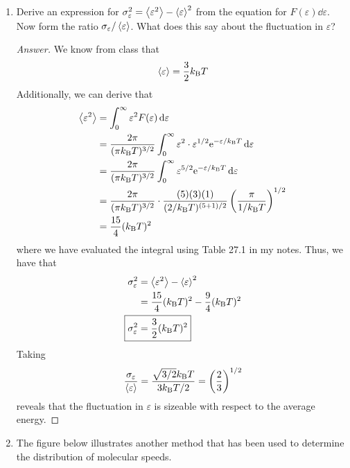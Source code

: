 \documentclass[../psets.tex]{subfiles}
\begin{document}
\begin{enumerate}[label={\textbf{27-\arabic*.}},leftmargin=3.5em]
    \item Derive an expression for $\sigma_\varepsilon^2=\prb{\varepsilon^2}-\prb{\varepsilon}^2$ from the equation for $F(\varepsilon)\dd{\varepsilon}$. Now form the ratio $\sigma_\varepsilon/\prb{\varepsilon}$. What does this say about the fluctuation in $\varepsilon$?
    \begin{proof}[Answer]
        We know from class that
        \begin{equation*}
            \prb{\varepsilon} = \frac{3}{2}\kB T
        \end{equation*}
        Additionally, we can derive that
        \begin{align*}
            \prb{\varepsilon^2} &= \int_0^\infty\varepsilon^2F(\varepsilon)\dd{\varepsilon}\\
            &= \frac{2\pi}{(\pi\kB T)^{3/2}}\int_0^\infty\varepsilon^2\cdot\varepsilon^{1/2}\e[-\varepsilon/\kB T]\dd{\varepsilon}\\
            &= \frac{2\pi}{(\pi\kB T)^{3/2}}\int_0^\infty\varepsilon^{5/2}\e[-\varepsilon/\kB T]\dd{\varepsilon}\\
            &= \frac{2\pi}{(\pi\kB T)^{3/2}}\cdot\frac{(5)(3)(1)}{(2/\kB T)^{(5+1)/2}}\left( \frac{\pi}{1/\kB T} \right)^{1/2}\\
            &= \frac{15}{4}(\kB T)^2
        \end{align*}
        where we have evaluated the integral using Table 27.1 in my notes. Thus, we have that
        \begin{align*}
            \sigma_\varepsilon^2 &= \prb{\varepsilon^2}-\prb{\varepsilon}^2\\
            &= \frac{15}{4}(\kB T)^2-\frac{9}{4}(\kB T)^2\\
            \Aboxed{\sigma_\varepsilon^2 &= \frac{3}{2}(\kB T)^2}
        \end{align*}
        Taking
        \begin{equation*}
            \frac{\sigma_\varepsilon}{\prb{\varepsilon}} = \frac{\sqrt{3/2}\kB T}{3\kB T/2}
            = \left( \frac{2}{3} \right)^{1/2}
        \end{equation*}
        reveals that the fluctuation in $\varepsilon$ is sizeable with respect to the average energy.
    \end{proof}
    \setcounter{enumi}{33}
    \item The figure below illustrates another method that has been used to determine the distribution of molecular speeds.
    \begin{figure}[H]
        \centering
        \footnotesize
        \begin{subfigure}[b]{0.49\linewidth}
            \centering
\end{subfigure}
\end{figure}
\end{enumerate}
\end{document}
